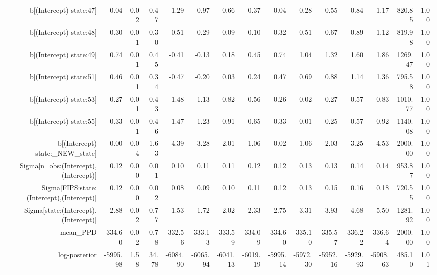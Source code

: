 \begin{table}[ht]
\begin{tabular}{rrrrrrrrrrrrrrr}
  b[(Intercept) state:47] & -0.04 & 0.02 & 0.47 & -1.29 & -0.97 & -0.66 & -0.37 & -0.04 & 0.28 & 0.55 & 0.84 & 1.17 & 820.85 & 1.00 \\ 
  b[(Intercept) state:48] & 0.30 & 0.01 & 0.30 & -0.51 & -0.29 & -0.09 & 0.10 & 0.32 & 0.51 & 0.67 & 0.89 & 1.12 & 819.98 & 1.00 \\ 
  b[(Intercept) state:49] & 0.74 & 0.01 & 0.45 & -0.41 & -0.13 & 0.18 & 0.45 & 0.74 & 1.04 & 1.32 & 1.60 & 1.86 & 1269.47 & 1.00 \\ 
  b[(Intercept) state:51] & 0.46 & 0.01 & 0.34 & -0.47 & -0.20 & 0.03 & 0.24 & 0.47 & 0.69 & 0.88 & 1.14 & 1.36 & 795.58 & 1.00 \\ 
  b[(Intercept) state:53] & -0.27 & 0.01 & 0.43 & -1.48 & -1.13 & -0.82 & -0.56 & -0.26 & 0.02 & 0.27 & 0.57 & 0.83 & 1010.77 & 1.00 \\ 
  b[(Intercept) state:55] & -0.33 & 0.01 & 0.46 & -1.47 & -1.23 & -0.91 & -0.65 & -0.33 & -0.01 & 0.25 & 0.57 & 0.92 & 1140.08 & 1.00 \\ 
  b[(Intercept) state:\_NEW\_state] & 0.00 & 0.04 & 1.63 & -4.39 & -3.28 & -2.01 & -1.06 & -0.02 & 1.06 & 2.03 & 3.25 & 4.53 & 2000.00 & 1.00 \\ 
  Sigma[n\_obs:(Intercept),(Intercept)] & 0.12 & 0.00 & 0.01 & 0.10 & 0.11 & 0.11 & 0.12 & 0.12 & 0.13 & 0.13 & 0.14 & 0.14 & 953.87 & 1.00 \\ 
  Sigma[FIPS:state:(Intercept),(Intercept)] & 0.12 & 0.00 & 0.02 & 0.08 & 0.09 & 0.10 & 0.11 & 0.12 & 0.13 & 0.15 & 0.16 & 0.18 & 720.55 & 1.00 \\ 
  Sigma[state:(Intercept),(Intercept)] & 2.88 & 0.02 & 0.77 & 1.53 & 1.72 & 2.02 & 2.33 & 2.75 & 3.31 & 3.93 & 4.68 & 5.50 & 1281.92 & 1.00 \\ 
  mean\_PPD & 334.60 & 0.02 & 0.78 & 332.56 & 333.13 & 333.59 & 334.09 & 334.60 & 335.10 & 335.57 & 336.22 & 336.64 & 2000.00 & 1.00 \\ 
  log-posterior & -5995.98 & 1.58 & 34.78 & -6084.90 & -6065.94 & -6041.13 & -6019.19 & -5995.14 & -5972.30 & -5952.16 & -5929.93 & -5908.63 & 485.10 & 1.01 \\ 
   \hline
\end{tabular}
\end{table}
